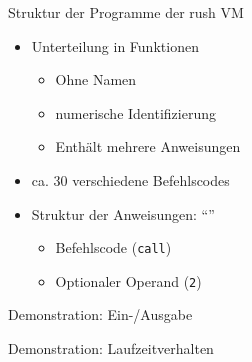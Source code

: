 \begin{frame}{Struktur der Programme der rush VM}
	\begin{itemize}
		\item<1-> Unterteilung in Funktionen
		      \begin{itemize}
			      \item Ohne Namen
			      \item numerische Identifizierung
			      \item Enthält mehrere Anweisungen
		      \end{itemize}
		\item<2-> ca. 30 verschiedene Befehlscodes
		\item<3-> Struktur der Anweisungen: \enquote{}
		      \begin{itemize}
			      \item<3-> Befehlscode (\texttt{call})
			      \item<3-> Optionaler Operand (\texttt{2})
		      \end{itemize}
	\end{itemize}
\end{frame}

\begin{frame}{Demonstration: Ein-/Ausgabe}
	\begin{minipage}{0.5\textwidth}
		\centering
	\end{minipage}
	\hfill
	\begin{minipage}{0.35\textwidth}
	\end{minipage}
\end{frame}

\begin{frame}{Demonstration: Laufzeitverhalten}
	\begin{figure}[H]
		\href{run:assets/01_rush_presentation_vm.mkv}{
		}
	\end{figure}
\end{frame}

